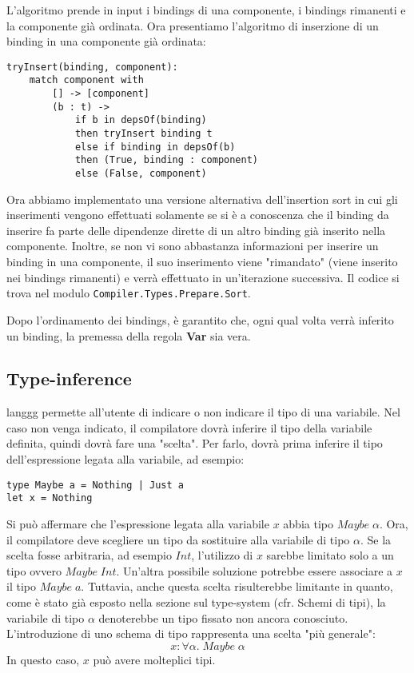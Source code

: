 \documentclass[10pt,a4paper]{article}
\begin{document}
L'algoritmo prende in input i bindings di una componente, i bindings rimanenti e la componente già ordinata. Ora
presentiamo l'algoritmo di inserzione di un binding in una componente già ordinata:
\begin{lstlisting}
tryInsert(binding, component):
    match component with
        [] -> [component]
        (b : t) ->
            if b in depsOf(binding)
            then tryInsert binding t
            else if binding in depsOf(b)
            then (True, binding : component)
            else (False, component)
\end{lstlisting}
Ora abbiamo implementato una versione alternativa dell'insertion sort in cui gli inserimenti vengono effettuati
solamente se si è a conoscenza che il binding da inserire fa parte delle dipendenze dirette di un altro binding già
inserito nella componente. Inoltre, se non vi sono abbastanza informazioni per inserire un binding in una componente,
il suo inserimento viene "rimandato" (viene inserito nei bindings rimanenti) e verrà effettuato in un'iterazione
successiva. Il codice si trova nel modulo \texttt{Compiler.Types.Prepare.Sort}.

Dopo l'ordinamento dei bindings, è garantito che, ogni qual volta verrà inferito un binding, la premessa
della regola \textbf{Var} sia vera.

\subsection{Type-inference}
langgg permette all'utente di indicare o non indicare il tipo di una variabile. Nel caso non venga indicato, il
compilatore dovrà inferire il tipo della variabile definita, quindi dovrà fare una "scelta". Per farlo, dovrà prima
inferire il tipo dell'espressione legata alla variabile, ad esempio:
\begin{lstlisting}
type Maybe a = Nothing | Just a
let x = Nothing
\end{lstlisting}
Si può affermare che l'espressione legata alla variabile $ x $ abbia tipo $ Maybe \; \alpha $. Ora, il compilatore
deve scegliere un tipo da sostituire alla variabile di tipo $ \alpha $. Se la scelta fosse arbitraria, ad esempio
$ Int $, l'utilizzo di $ x $ sarebbe limitato solo a un tipo ovvero $ Maybe \; Int $. Un'altra possibile soluzione
potrebbe essere associare a $ x $ il tipo $ Maybe \; a $. Tuttavia, anche questa scelta risulterebbe limitante in quanto,
come è stato già esposto nella sezione sul type-system (cfr. Schemi di tipi), la variabile di tipo $ \alpha $
denoterebbe un tipo fissato non ancora conosciuto. L'introduzione di uno schema di tipo rappresenta una scelta
"più generale":
\[ x : \forall \alpha. \; Maybe \; \alpha \]
In questo caso, $ x $ può avere molteplici tipi.
\end{document}
